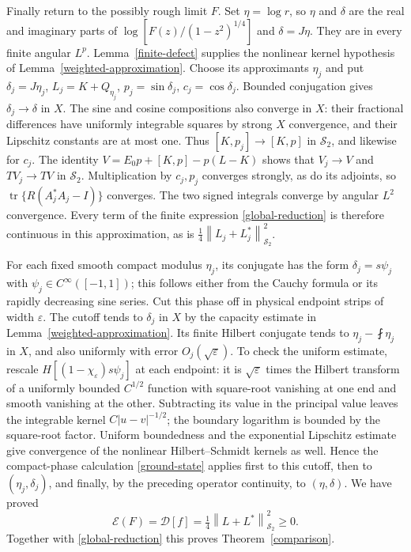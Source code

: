 \documentclass[a4paper,11pt]{amsart}
\theoremstyle{remark}\newtheorem{remark}[theorem]{Remark}
\newcommand{\tr}{\operatorname{tr}}
\newcommand{\HS}{\mathcal S_2}
\newcommand{\norm}[1]{\left\lVert#1\right\rVert}
\begin{document}
Finally return to the possibly rough limit $F$.
Set $\eta=\log r$, so $\eta$ and $\delta$ are the real and imaginary
parts of $\log[F(z)/(1-z^2)^{1/4}]$ and $\delta=J\eta$.
They are in every finite angular $L^p$.
Lemma~\ref{finite-defect} supplies the nonlinear kernel hypothesis
of Lemma~\ref{weighted-approximation}. Choose its approximants
$\eta_j$ and put $\delta_j=J\eta_j$, $L_j=K+Q_{\eta_j}$,
$p_j=\sin\delta_j$, $c_j=\cos\delta_j$.
Bounded conjugation gives $\delta_j\to\delta$ in $X$.
The sine and cosine compositions also converge in $X$: their
fractional differences have uniformly integrable squares by strong
$X$ convergence, and their Lipschitz constants are at most one.
Thus $[K,p_j]\to[K,p]$ in $\HS$, and likewise for $c_j$.
The identity
$V=E_0p+[K,p]-p(L-K)$ shows that $V_j\to V$ and $TV_j\to TV$
in $\HS$. Multiplication by $c_j,p_j$ converges strongly,
as do its adjoints, so $\tr\{R(A_j^*A_j-I)\}$ converges.
The two signed integrals converge by angular $L^2$ convergence.
Every term of the finite expression \eqref{global-reduction} is
therefore continuous in this approximation, as is
$\tfrac14\norm{L_j+L_j^*}_{\HS}^2$.

For each fixed smooth compact modulus $\eta_j$, its conjugate has
the form $\delta_j=s\psi_j$ with $\psi_j\in C^\infty([-1,1])$;
this follows either from the Cauchy formula or its rapidly decreasing
sine series. Cut this phase off in physical endpoint strips of
width $\varepsilon$. The cutoff tends to $\delta_j$ in $X$ by
the capacity estimate in Lemma~\ref{weighted-approximation}.
Its finite Hilbert conjugate tends to
$\eta_j-\fint\eta_j$ in $X$, and also uniformly with error
$O_j(\sqrt\varepsilon)$. To check the uniform estimate, rescale
$H[(1-\chi_\varepsilon)s\psi_j]$ at each endpoint: it is
$\sqrt\varepsilon$ times the Hilbert transform of a uniformly
bounded $C^{1/2}$ function with square-root vanishing at one end
and smooth vanishing at the other. Subtracting its value in the
principal value leaves the integrable kernel $C|u-v|^{-1/2}$;
the boundary logarithm is bounded by the square-root factor.
Uniform boundedness and the exponential Lipschitz estimate give
convergence of the nonlinear Hilbert--Schmidt kernels as well.
Hence the compact-phase calculation \eqref{ground-state} applies
first to this cutoff, then to $(\eta_j,\delta_j)$, and finally,
by the preceding operator continuity, to $(\eta,\delta)$.
We have proved
\begin{equation}\label{final-identity}
 \mathcal E(F)=\mathcal D[f]=\tfrac14\norm{L+L^*}_{\HS}^2\ge0.
\end{equation}
Together with \eqref{global-reduction} this proves
Theorem~\ref{comparison}.
\end{document}
